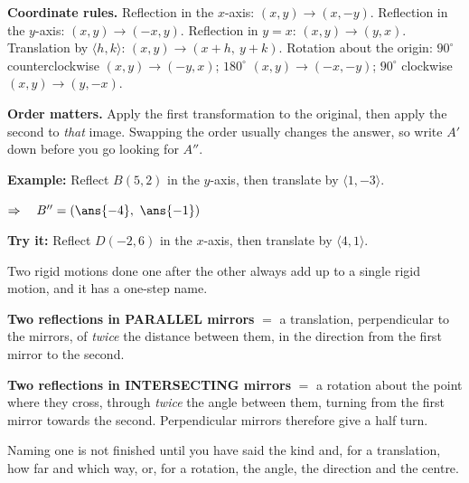 \documentclass[12pt]{article}
\begin{document}


\begin{formulabox}
\textbf{Coordinate rules.} Reflection in the $x$-axis: $(x, y) \to (x, -y)$. \quad Reflection
in the $y$-axis: $(x, y) \to (-x, y)$. \quad Reflection in $y = x$: $(x, y) \to (y, x)$. \quad
Translation by $\langle h, k \rangle$: $(x, y) \to (x + h,\ y + k)$. \quad Rotation about the
origin: $90^\circ$ counterclockwise $(x,y) \to (-y, x)$; $180^\circ$ $(x,y) \to (-x, -y)$;
$90^\circ$ clockwise $(x,y) \to (y, -x)$.\par
\smallskip
\textbf{Order matters.} Apply the first transformation to the original, then apply the second
to \emph{that} image. Swapping the order usually changes the answer, so write $A'$ down before
you go looking for $A''$.
\end{formulabox}

\begin{examplebox}
\textbf{Example:} \quad Reflect $B(5, 2)$ in the $y$-axis, then translate by
$\langle 1, -3 \rangle$.

$\Rightarrow\quad B'' = (\ans{-4},\ \ans{-1})$
\end{examplebox}

\begin{tryitbox}
\textbf{Try it:} \quad Reflect $D(-2, 6)$ in the $x$-axis, then translate by
$\langle 4, 1 \rangle$.\\[2pt]
\end{tryitbox}


\begin{formulabox}
Two rigid motions done one after the other always add up to a single rigid motion, and it has a
one-step name.\par
\smallskip
\textbf{Two reflections in PARALLEL mirrors} $=$ a translation, perpendicular to the mirrors,
of \emph{twice} the distance between them, in the direction from the first mirror to the
second.\par
\smallskip
\textbf{Two reflections in INTERSECTING mirrors} $=$ a rotation about the point where they
cross, through \emph{twice} the angle between them, turning from the first mirror towards the
second. Perpendicular mirrors therefore give a half turn.\par
\smallskip
Naming one is not finished until you have said the kind and, for a translation, how far and
which way, or, for a rotation, the angle, the direction and the centre.
\end{formulabox}
\end{document}
